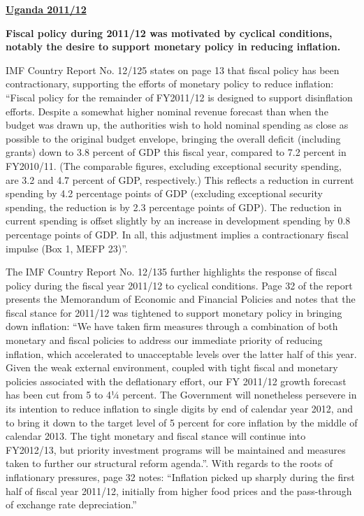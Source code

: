 \textbf{\underline{Uganda 2011/12}}

\textbf{Fiscal policy during 2011/12 was motivated by cyclical conditions, notably the desire to support monetary policy in reducing inflation.}

IMF Country Report No. 12/125 states on page 13 that fiscal policy has been contractionary, supporting the efforts of monetary policy to reduce inflation: “Fiscal policy for the remainder of FY2011/12 is designed to support disinflation efforts.  Despite a somewhat higher nominal revenue forecast than when the budget was drawn up, the authorities wish to hold nominal spending as close as possible to the original budget envelope, bringing the overall deficit (including grants) down to 3.8 percent of GDP this fiscal year, compared to 7.2 percent in FY2010/11. (The comparable figures, excluding exceptional security spending, are 3.2 and 4.7 percent of GDP, respectively.) This reflects a reduction in current spending by 4.2 percentage points of GDP (excluding exceptional security spending, the reduction is by 2.3 percentage points of GDP). The reduction in current spending is offset slightly by an increase in development spending by 0.8 percentage points of GDP. In all, this adjustment implies a contractionary fiscal impulse (Box 1, MEFP 23)”.

The IMF Country Report No. 12/135 further highlights the response of fiscal policy during the fiscal year 2011/12 to cyclical conditions. Page 32 of the report presents the Memorandum of Economic and Financial Policies and notes that the fiscal stance for 2011/12 was tightened to support monetary policy in bringing down inflation: “We have taken firm measures through a combination of both monetary and fiscal policies to address our immediate priority of reducing inflation, which accelerated to unacceptable levels over the latter half of this year. Given the weak external environment, coupled with tight fiscal and monetary policies associated with the deflationary effort, our FY 2011/12 growth forecast has been cut from 5 to 4¼ percent. The Government will nonetheless persevere in its intention to reduce inflation to single digits by end of calendar year 2012, and to bring it down to the target level of 5 percent for core inflation by the middle of calendar 2013. The tight monetary and fiscal stance will continue into FY2012/13, but priority investment programs will be maintained and measures taken to further our structural reform agenda.”.
With regards to the roots of inflationary pressures, page 32 notes: “Inflation picked up sharply during the first half of fiscal year 2011/12, initially from higher food prices and the pass-through of exchange rate depreciation.”

